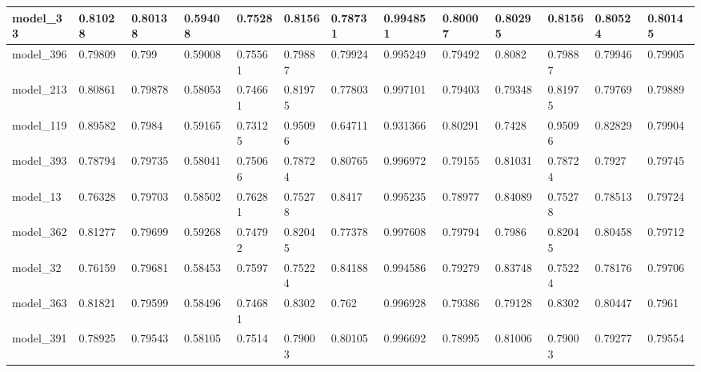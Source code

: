 \begin{tabular}{|l|l|l|l|l|l|l|l|l|l|l|l|l|}
model\_33      & 0.81028     & 0.80138        & 0.59408      & 0.7528           & 0.8156               & 0.78731              & 0.994851     & 0.80007           & 0.80295            & 0.8156          & 0.80524     & 0.80145      \\ \hline
model\_396     & 0.79809     & 0.799          & 0.59008      & 0.75561          & 0.79887              & 0.79924              & 0.995249     & 0.79492           & 0.8082             & 0.79887         & 0.79946     & 0.79905      \\ \hline
model\_213     & 0.80861     & 0.79878        & 0.58053      & 0.74661          & 0.81975              & 0.77803              & 0.997101     & 0.79403           & 0.79348            & 0.81975         & 0.79769     & 0.79889      \\ \hline
model\_119     & 0.89582     & 0.7984         & 0.59165      & 0.73125          & 0.95096              & 0.64711              & 0.931366     & 0.80291           & 0.7428             & 0.95096         & 0.82829     & 0.79904      \\ \hline
model\_393     & 0.78794     & 0.79735        & 0.58041      & 0.75066          & 0.78724              & 0.80765              & 0.996972     & 0.79155           & 0.81031            & 0.78724         & 0.7927      & 0.79745      \\ \hline
model\_13      & 0.76328     & 0.79703        & 0.58502      & 0.76281          & 0.75278              & 0.8417               & 0.995235     & 0.78977           & 0.84089            & 0.75278         & 0.78513     & 0.79724      \\ \hline
model\_362     & 0.81277     & 0.79699        & 0.59268      & 0.74792          & 0.82045              & 0.77378              & 0.997608     & 0.79794           & 0.7986             & 0.82045         & 0.80458     & 0.79712      \\ \hline
model\_32      & 0.76159     & 0.79681        & 0.58453      & 0.7597           & 0.75224              & 0.84188              & 0.994586     & 0.79279           & 0.83748            & 0.75224         & 0.78176     & 0.79706      \\ \hline
model\_363     & 0.81821     & 0.79599        & 0.58496      & 0.74681          & 0.8302               & 0.762                & 0.996928     & 0.79386           & 0.79128            & 0.8302          & 0.80447     & 0.7961       \\ \hline
model\_391     & 0.78925     & 0.79543        & 0.58105      & 0.7514           & 0.79003              & 0.80105              & 0.996692     & 0.78995           & 0.81006            & 0.79003         & 0.79277     & 0.79554      \\ \hline

\end{tabular}
